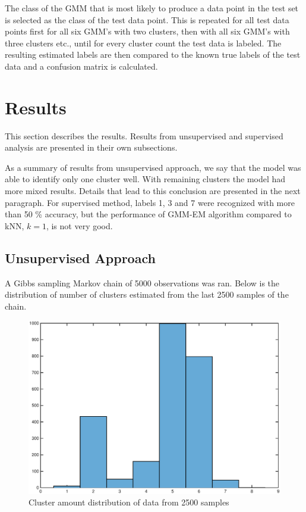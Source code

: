\documentclass[a4paper]{article}
\begin{document}
\par
The class of the GMM that is most likely to produce a data point in the test
set is selected as the class of the test data point. This is repeated for all
test data points first for all six GMM's with two clusters, then with all six
GMM's with three clusters etc., until for every cluster count the test data is
labeled. The resulting estimated labels are then compared to the known true
labels of the test data and a confusion matrix is calculated.

\section{Results}

This section describes the results. Results from unsupervised and supervised analysis are presented in their own subsections.

As a summary of results from unsupervised approach, we say that the model was able to identify only one cluster well. With remaining clusters the model had more mixed results. Details that lead to this conclusion are presented in the next paragraph. For supervised method, labels 1, 3 and 7 were recognized with more than 50 \% accuracy, but the performance of GMM-EM algorithm compared to kNN, $ k = 1 $, is not very good.

\subsection{Unsupervised Approach}

\par
A Gibbs sampling Markov chain of 5000 observations was ran. Below is the distribution of number of clusters estimated from the last 2500 samples of the chain.

\begin{figure}[H]
	\includegraphics[trim={2cm 1cm 2cm 1cm},clip,scale=0.56]{k_dist_5000.eps}
	\caption{Cluster amount distribution of data from 2500 samples}
	\label{k_dist}
\end{figure}
\end{document}

